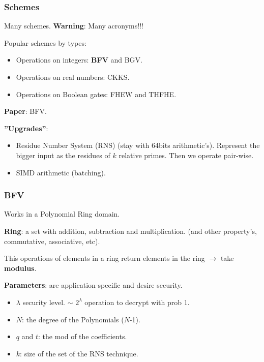 \documentclass[10pt,handout]{beamer}
\begin{document}
\begin{frame}
    \frametitle{Schemes}

    Many schemes. \textbf{Warning}: Many acronyms!!!

    Popular schemes by types:
    \begin{itemize}\vspace{-0.2cm}
        \item Operations on integers: \textbf{BFV} and BGV.\vspace{-0.2cm}
        \item Operations on real numbers: CKKS.\vspace{-0.2cm}
        \item Operations on Boolean gates: FHEW and THFHE.
    \end{itemize}

    \textbf{Paper}: BFV.

    \textbf{''Upgrades''}:
\begin{itemize}\vspace{-0.2cm}
    \item Residue Number System (RNS) (stay with 64bits arithmetic's).        Represent the bigger input as the residues of $k$ relative primes.
        Then we operate pair-wise.
 \vspace{-0.2cm}
   \item SIMD arithmetic (batching).
\end{itemize}


\end{frame}



\begin{frame}
    \frametitle{BFV}

Works in a Polynomial Ring domain.

\textbf{Ring}: a set with addition, subtraction and multiplication. (and other property's, commutative, associative, etc).

    This operations of elements in a ring return elements in the ring $\rightarrow$ take \textbf{modulus}.

\textbf{Parameters}: are application-specific and desire security.

\begin{itemize}
    \item $\lambda$ security level. $\sim$ $2^\lambda$ operation to decrypt with prob 1.
    \item $N$: the degree of the Polynomials ($N$-1).
    \item $q$ and $t$: the mod of the coefficients.
    \item $k$: size of the set of the RNS technique.
\end{itemize}


\end{frame}
\end{document}
